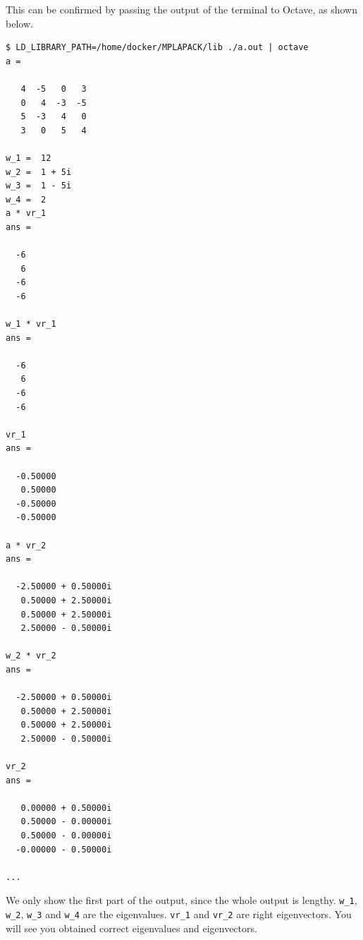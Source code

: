 \documentclass[12pt]{article}
\begin{document}
This can be confirmed by passing the output of the terminal to Octave, as shown below.
{\footnotesize
\begin{verbatim}
$ LD_LIBRARY_PATH=/home/docker/MPLAPACK/lib ./a.out | octave
a =

   4  -5   0   3
   0   4  -3  -5
   5  -3   4   0
   3   0   5   4

w_1 =  12
w_2 =  1 + 5i
w_3 =  1 - 5i
w_4 =  2
a * vr_1
ans =

  -6
   6
  -6
  -6

w_1 * vr_1
ans =

  -6
   6
  -6
  -6

vr_1
ans =

  -0.50000
   0.50000
  -0.50000
  -0.50000

a * vr_2
ans =

  -2.50000 + 0.50000i
   0.50000 + 2.50000i
   0.50000 + 2.50000i
   2.50000 - 0.50000i

w_2 * vr_2
ans =

  -2.50000 + 0.50000i
   0.50000 + 2.50000i
   0.50000 + 2.50000i
   2.50000 - 0.50000i

vr_2
ans =

   0.00000 + 0.50000i
   0.50000 - 0.00000i
   0.50000 - 0.00000i
  -0.00000 - 0.50000i

...
\end{verbatim}
}
We only show the first part of the output, since the whole output is lengthy. 
{\tt w\_1}, {\tt w\_2}, {\tt w\_3} and {\tt w\_4} are the eigenvalues. {\tt vr\_1} and {\tt vr\_2} are right eigenvectors. You will see you obtained correct eigenvalues and eigenvectors.
\end{document}

